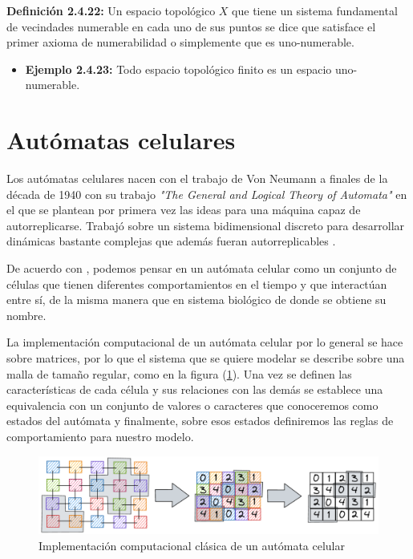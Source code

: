 \textbf{Definición 2.4.22:} Un espacio topológico $X$ que tiene un sistema fundamental de vecindades numerable en cada uno de sus puntos se dice que satisface el primer axioma de numerabilidad o simplemente que es uno-numerable.

\begin{itemize}
    \item \textbf{Ejemplo 2.4.23:} Todo espacio topológico finito es un espacio uno-numerable.
\end{itemize}

\section{Autómatas celulares}\label{sec:Autómatas celulares}

Los autómatas celulares nacen con el trabajo de Von Neumann a finales de la década de 1940 con su trabajo \textit{"The General and Logical Theory of Automata"} en el que se plantean por primera vez las ideas para una máquina capaz de autorreplicarse. Trabajó sobre un sistema bidimensional discreto para desarrollar dinámicas bastante complejas que además fueran autorreplicables \cite{alfons2010,ACaplicacionesComputacion}.

De acuerdo con \cite{descripcionyAplicaciones}, podemos pensar en un autómata celular como un conjunto de células que tienen diferentes comportamientos en el tiempo y que interactúan entre sí, de la misma manera que en sistema biológico de donde se obtiene su nombre.

La implementación computacional de un autómata celular por lo general se hace sobre matrices, por lo que el sistema que se quiere modelar se describe sobre una malla de tamaño regular, como en la figura (\ref{fig:AC a matriz}). Una vez se definen las características de cada célula y sus relaciones con las demás se establece una equivalencia con un conjunto de valores o caracteres que conoceremos como estados del autómata y finalmente, sobre esos estados definiremos las reglas de comportamiento para nuestro modelo.

\begin{figure}[h]
  \centering
    \includegraphics[width=1\textwidth]{Imagenes/ACaMatriz.PNG}
  \caption{Implementación computacional clásica de un autómata celular}
  \label{fig:AC a matriz}
\end{figure}

